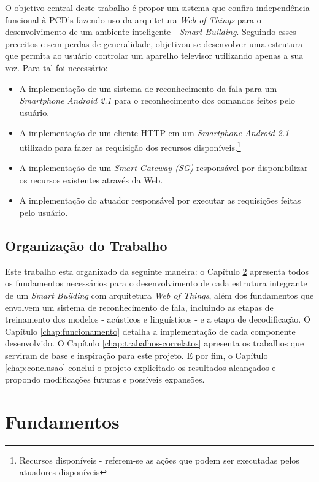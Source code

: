 \documentclass[12pt,a4paper,oneside]{report}
\begin{document}
O objetivo central deste trabalho é propor um sistema que confira independência funcional à PCD's fazendo uso da arquitetura \emph{Web of Things} para o desenvolvimento de um ambiente inteligente - \emph{Smart Building}. Seguindo esses preceitos e sem perdas de generalidade, objetivou-se desenvolver uma estrutura que permita ao usuário controlar um aparelho televisor utilizando apenas a sua voz. Para tal foi necessário:
\begin{itemize}
\item A implementação de um sistema de reconhecimento da fala para um \emph{Smartphone Android 2.1} para o reconhecimento dos comandos feitos pelo usuário.
\item A implementação de um cliente HTTP em um \emph{Smartphone Android 2.1} utilizado para fazer as requisição dos recursos disponíveis.\footnote{Recursos disponíveis - referem-se as ações que podem ser executadas pelos atuadores disponíveis}
\item A implementação de um \emph{Smart Gateway (SG)} responsável por disponibilizar os recursos existentes através da Web.
\item A implementação do atuador responsável por executar as requisições feitas pelo usuário.
\end{itemize}

\section{Organização do Trabalho}

Este trabalho esta organizado da seguinte maneira: o Capítulo \ref{chap:fundamentos} apresenta todos os fundamentos necessários para o desenvolvimento de cada estrutura integrante de um \emph{Smart Building} com arquitetura \emph{Web of Things}, além dos fundamentos que envolvem um sistema de reconhecimento de fala, incluindo as etapas de treinamento dos modelos - acústicos e linguísticos - e a etapa de decodificação. O Capítulo \ref{chap:funcionamento} detalha a implementação de cada componente desenvolvido. O Capítulo \ref{chap:trabalhos-correlatos} apresenta os trabalhos que serviram de base e inspiração para este projeto. E por fim, o Capítulo \ref{chap:conclusao} conclui o projeto explicitado os resultados alcançados e propondo modificações futuras e possíveis expansões.

\chapter{Fundamentos}
\label{chap:fundamentos}
\end{document}
